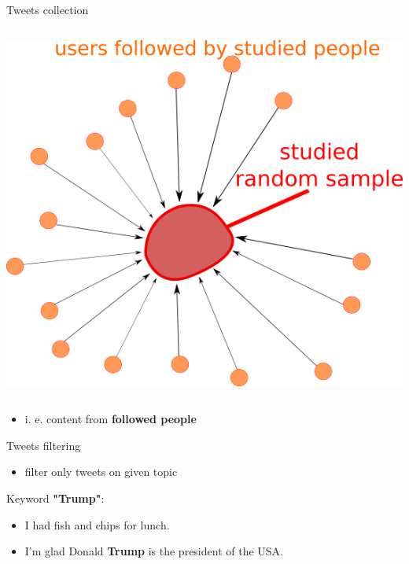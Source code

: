 \documentclass[landscape,a0paper,fontscale=0.285]{baposter} %
\begin{document}
\begin{poster}
\begin{columns}[T]
\begin{column}{.33\textwidth}
\begin{block}{Tweets collection}
\begin{columns}
    	\includegraphics[scale=0.65]{./Pics/followers.png}
    \end{columns}
    \vspace{0.8cm}
    \begin{itemize}
        \item i. e. content from \textbf{followed people}
    \end{itemize}
\end{block}
\begin{block}{Tweets filtering}
\begin{itemize}
    \item filter only tweets on given topic
\end{itemize}
\vspace{0.3cm}
Keyword \textbf{"Trump"}:
\vspace{0.7cm}
\begin{itemize}\centering
    \item[\textcolor{black}{\xmark}] I had fish and chips for lunch.
    \item[\textcolor{black}{\cmark}] I'm glad Donald \textbf{Trump} is the president of the USA.
\end{itemize}
\end{block}

\end{column}
\end{columns}
\end{poster}
\end{document}
